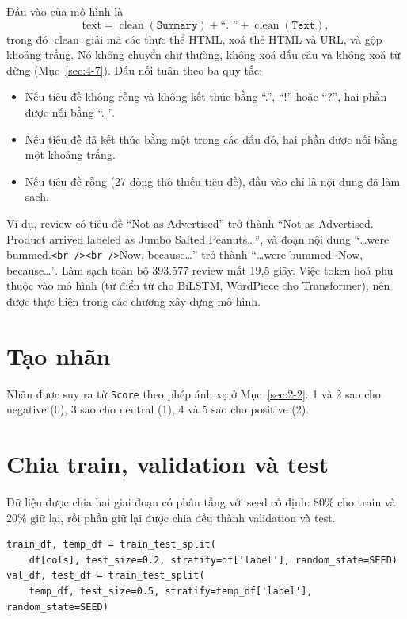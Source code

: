 Đầu vào của mô hình là
\begin{equation*}
    \text{text} = \operatorname{clean}(\texttt{Summary}) + \text{``. ''} + \operatorname{clean}(\texttt{Text}),
\end{equation*}
trong đó $\operatorname{clean}$ giải mã các thực thể HTML, xoá thẻ HTML và URL, và gộp khoảng trắng. Nó không chuyển chữ thường, không xoá dấu câu và không xoá từ dừng (Mục~\ref{sec:4-7}). Dấu nối tuân theo ba quy tắc:
\begin{itemize}
    \item Nếu tiêu đề không rỗng và không kết thúc bằng ``.'', ``!'' hoặc ``?'', hai phần được nối bằng ``. ''.
    \item Nếu tiêu đề đã kết thúc bằng một trong các dấu đó, hai phần được nối bằng một khoảng trắng.
    \item Nếu tiêu đề rỗng (27 dòng thô thiếu tiêu đề), đầu vào chỉ là nội dung đã làm sạch.
\end{itemize}
Ví dụ, review có tiêu đề ``Not as Advertised'' trở thành ``Not as Advertised. Product arrived labeled as Jumbo Salted Peanuts\ldots'', và đoạn nội dung ``\ldots were bummed.\texttt{<br />}\texttt{<br />}Now, because\ldots'' trở thành ``\ldots were bummed. Now, because\ldots''. Làm sạch toàn bộ 393.577 review mất 19,5 giây. Việc token hoá phụ thuộc vào mô hình (từ điển từ cho BiLSTM, WordPiece cho Transformer), nên được thực hiện trong các chương xây dựng mô hình.

\section{Tạo nhãn}
\label{sec:5-4}

Nhãn được suy ra từ \texttt{Score} theo phép ánh xạ ở Mục~\ref{sec:2-2}: 1 và 2 sao cho negative (0), 3 sao cho neutral (1), 4 và 5 sao cho positive (2).

\section{Chia train, validation và test}
\label{sec:5-5}

Dữ liệu được chia hai giai đoạn có phân tầng với seed cố định: 80\% cho train và 20\% giữ lại, rồi phần giữ lại được chia đều thành validation và test.

\begin{lstlisting}
train_df, temp_df = train_test_split(
    df[cols], test_size=0.2, stratify=df['label'], random_state=SEED)
val_df, test_df = train_test_split(
    temp_df, test_size=0.5, stratify=temp_df['label'], random_state=SEED)
\end{lstlisting}

